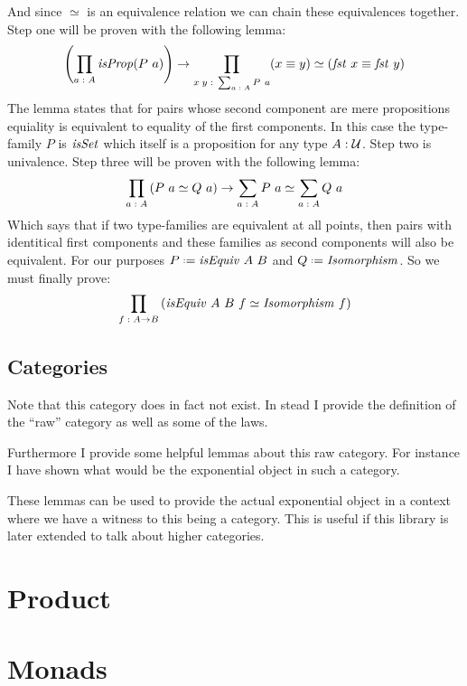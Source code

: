 And since $\simeq$ is an equivalence relation we can chain these equivalences
together. Step one will be proven with the following lemma:
%
$$
\left(\prod_{a \;\mathord{:}\; A} \mathit{isProp} (P\ a)\right) \to \prod_{x\;y \;\mathord{:}\; \sum_{a \;\mathord{:}\; A} P\ a} (x \equiv y) \simeq (\mathit{fst}\ x \equiv \mathit{fst}\ y)
$$
%
The lemma states that for pairs whose second component are mere propositions
equiality is equivalent to equality of the first components. In this case the
type-family $P$ is $\mathit{isSet}$ which itself is a proposition for any type $A \;\mathord{:}\;
\mathcal{U}$. Step two is univalence. Step three will be proven with the following
lemma:
%
$$
\prod_{a \;\mathord{:}\; A} \left( P\ a \simeq Q\ a \right) \to \sum_{a \;\mathord{:}\; A} P\ a \simeq \sum_{a \;\mathord{:}\; A} Q\ a
$$
%
Which says that if two type-families are equivalent at all points, then pairs
with identitical first components and these families as second components will
also be equivalent. For our purposes $P \defeq \isEquiv\ A\ B$ and $Q \defeq
\mathit{Isomorphism}$. So we must finally prove:
%
$$
\prod_{f \;\mathord{:}\; A \to B} \left( \mathit{isEquiv}\ A\ B\ f \simeq \mathit{Isomorphism}\ f \right)
$$


\subsection{Categories}
Note that this category does in fact not exist. In stead I provide the
definition of the ``raw'' category as well as some of the laws.

Furthermore I provide some helpful lemmas about this raw category. For instance
I have shown what would be the exponential object in such a category.

These lemmas can be used to provide the actual exponential object in a context
where we have a witness to this being a category. This is useful if this library
is later extended to talk about higher categories.


\section{Product}
\section{Monads}


